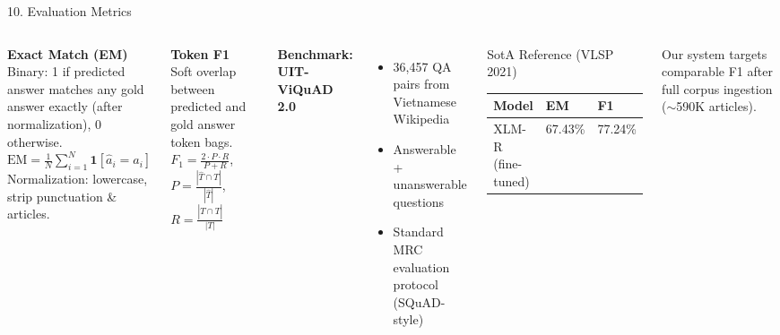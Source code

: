 \documentclass[aspectratio=169]{beamer}
\begin{document}
\begin{frame}[shrink=15]{10. Evaluation Metrics}
\begin{columns}[T]
\textbf{Exact Match (EM)}\\[3pt]
{\small Binary: 1 if predicted answer matches any gold answer exactly (after normalization), 0 otherwise.}\\[2pt]
{\small $\displaystyle\text{EM} = \frac{1}{N}\sum_{i=1}^{N}\mathbf{1}[\hat{a}_i = a_i]$}\\[2pt]
{\small Normalization: lowercase, strip punctuation \& articles.}

\vspace{0.6em}
\textbf{Token F1}\\[3pt]
{\small Soft overlap between predicted and gold answer token bags.}\\[2pt]
{\small $\displaystyle F_1 = \frac{2 \cdot P \cdot R}{P + R}$, \quad $P = \frac{|\hat{T} \cap T|}{|\hat{T}|}$, \quad $R = \frac{|\hat{T} \cap T|}{|T|}$}

\textbf{Benchmark: UIT-ViQuAD 2.0}\\[4pt]
\begin{itemize}
  \item 36{,}457 QA pairs from Vietnamese Wikipedia
  \item Answerable + unanswerable questions
  \item Standard MRC evaluation protocol (SQuAD-style)
\end{itemize}
\vspace{0.4em}
\begin{block}{SotA Reference (VLSP 2021)}
\begin{center}
\footnotesize
\begin{tabular}{lll}
\toprule
\textbf{Model} & \textbf{EM} & \textbf{F1} \\
\midrule
XLM-R (fine-tuned) & 67.43\% & 77.24\% \\
\bottomrule
\end{tabular}
\end{center}
\end{block}
\vspace{0.3em}
{\small Our system targets comparable F1 after full corpus ingestion ($\sim$590K articles).}
\end{columns}
\end{frame}
\end{document}
